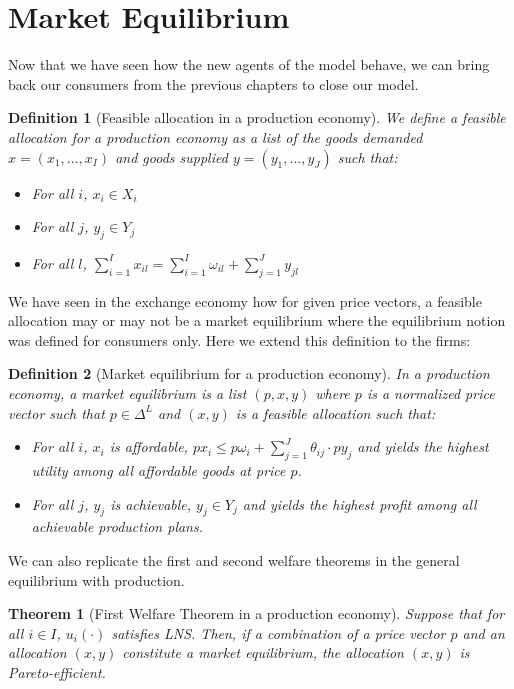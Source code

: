 \documentclass[12pt]{report}
\newtheorem{theorem}{Theorem}[chapter]
\newtheorem{definition}{Definition}[chapter]
\begin{document}
\section{Market Equilibrium}

Now that we have seen how the new agents of the model behave, we can bring back our consumers from the previous chapters to close our model.

\begin{definition}[Feasible allocation in a production economy]
We define a feasible allocation for a production economy as a list of the goods demanded $x = (x_1, ..., x_I)$ and goods supplied $y = (y_1, ..., y_J)$ such that:\begin{itemize}
\item[i.] For all $i$, $x_i \in X_i$
\item[ii.] For all $j$, $y_j \in Y_j$
\item[iii.] For all $l$, $\sum_{i=1}^{I} x_{il} = \sum_{i=1}^{I} \omega_{il} + \sum_{j=1}^{J} y_{jl} $
\end{itemize}
\end{definition} 

We have seen in the exchange economy how for given price vectors, a feasible allocation may or may not be a market equilibrium where the equilibrium notion was defined for consumers only. Here we extend this definition to the firms:\begin{definition}[Market equilibrium for a production economy]
In a production economy, a market equilibrium is a list $(p, x, y)$ where $p$ is a normalized price vector such that $p\in\Delta^L$ and $(x,y)$ is a feasible allocation such that:\begin{itemize}
\item[i.] For all $i$, $x_i$ is affordable, $p x_i \leq p \omega_i + \sum_{j=1}^{J} \theta_{ij}\cdot p y_j $ and yields the highest utility among all affordable goods at price $p$.
\item[ii.] For all $j$, $y_j$ is achievable, $y_j\in Y_j$ and yields the highest profit among all achievable production plans.
\end{itemize}
\end{definition}

We can also replicate the first and second welfare theorems in the general equilibrium with production.

\begin{theorem}[First Welfare Theorem in a production economy]
Suppose that for all $i\in I$, $u_i(\cdot)$  satisfies LNS. Then, if a combination of a price vector $p$ and an allocation $(x,y)$ constitute a market equilibrium, the allocation $(x,y)$ is Pareto-efficient.
\end{theorem}
\end{document}

